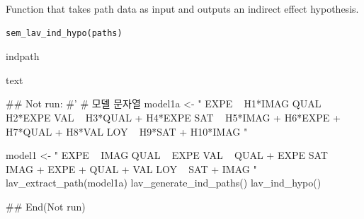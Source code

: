 \documentclass[a4paper]{book}
\begin{document}
%
\begin{Description}
Function that takes path data as input and outputs an indirect effect hypothesis.
\end{Description}
%
\begin{Usage}
\begin{verbatim}
sem_lav_ind_hypo(paths)
\end{verbatim}
\end{Usage}
%
\begin{Arguments}
\begin{ldescription}
\item[\code{paths}] indpath
\end{ldescription}
\end{Arguments}
%
\begin{Value}
text
\end{Value}
%
\begin{Examples}
\begin{ExampleCode}

\#\# Not run: 
#'
# 모델 문자열
model1a <- "
EXPE ~ H1*IMAG
QUAL ~ H2*EXPE
VAL ~ H3*QUAL + H4*EXPE
SAT ~ H5*IMAG + H6*EXPE + H7*QUAL + H8*VAL
LOY ~ H9*SAT + H10*IMAG
"

model1 <- "
EXPE ~ IMAG
QUAL ~ EXPE
VAL ~ QUAL + EXPE
SAT ~ IMAG + EXPE + QUAL + VAL
LOY ~ SAT + IMAG
"
lav_extract_path(model1a)%
  lav_generate_ind_paths() %
  lav_ind_hypo()


## End(Not run)

\end{ExampleCode}
\end{Examples}
\end{document}

